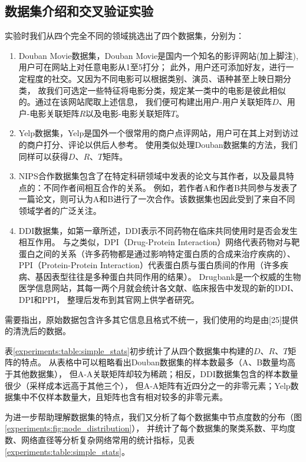\subsection{数据集介绍和交叉验证实验}
\label{experiments:sec:db_cv}
实验时我们从四个完全不同的领域挑选出了四个数据集，分别为：
\begin{enumerate}
    \item Douban Movie数据集，Douban Movie是国内一个知名的影评网站(加上脚注),用户可在网站上对任意电影从1至5打分；
    此外，用户还可添加好友，进行一定程度的社交。又因为不同电影可以根据类别、演员、语种甚至上映日期分类，
    故我们可选定一些特征将电影分类，规定某一类中的电影是彼此相似的。通过在该网站爬取上述信息，
    我们便可构建出用户-用户关联矩阵$D$、用户-电影关联矩阵$R$以及电影-电影关联矩阵$T$。
    \item Yelp数据集，Yelp是国外一个很常用的商户点评网站，用户可在其上对到访过的商户打分、评论以供后人参考。
    使用类似处理Douban数据集的方法，我们同样可以获得$D$、$R$、$T$矩阵。
    \item NIPS合作数据集包含了在特定科研领域中发表的论文与其作者，以及最具特点的：不同作者间相互合作的关系。
    例如，若作者A和作者B共同参与发表了一篇论文，则可认为A和B进行了一次合作。该数据集也因此受到了来自不同领域学者的广泛关注。
    \item DDI数据集，如第一章所述，DDI表示不同药物在临床共同使用时是否会发生相互作用。
    与之类似，DPI（Drug-Protein Interaction）网络代表药物对与靶蛋白之间的关系（许多药物都是通过影响特定蛋白质的合成来治疗疾病的）、
    PPI（Protein-Protein Interaction）代表蛋白质与蛋白质间的作用（许多疾病、基因表型往往是多种蛋白共同作用的结果）。
    Drugbank是一个权威的生物医学信息网站，其每一两个月就会统计各文献、临床报告中发现的新的DDI、DPI和PPI，
    整理后发布到其官网上供学者研究。
\end{enumerate}


需要指出，原始数据包含许多其它信息且格式不统一，我们使用的均是由[25]提供的清洗后的数据。


表\ref{experiments:table:simple_stats}初步统计了从四个数据集中构建的$D$、$R$、$T$矩阵的特点。
从表格中可以粗略看出Douban数据集的样本数最多（A、B数量均高于其他数据集），
但A-A关联矩阵却较为稀疏；相反，DDI数据集包含的样本数量很少（采样成本远高于其他三个），
但A-A矩阵有近四分之一的非零元素；Yelp数据集中不仅样本数量大，且矩阵也含有相对较多的非零元素。


为进一步帮助理解数据集的特点，我们又分析了每个数据集中节点度数的分布（图\ref{experiments:fig:node_distribution}），
并统计了每个数据集的聚类系数、平均度数、网络直径等分析复杂网络常用的统计指标，见表\ref{experiments:table:simple_stats}。


